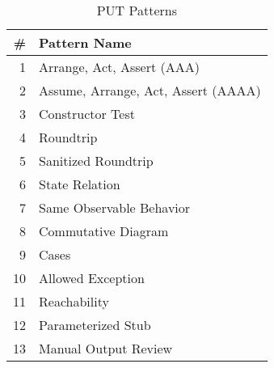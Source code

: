 \setlength{\tabcolsep}{2pt}
\begin{table}[t]
\begin{center}
\begin {tabular} {|r|l|}
\hline
									\#			&	Pattern Name									\\				%
\hline
\hline
									1				&	Arrange, Act, Assert (AAA)					\\				%
\hline
									2				&	Assume, Arrange, Act, Assert (AAAA) 	\\			%
\hline
									3				&	Constructor Test							\\				%
\hline
									4				&	Roundtrip											\\				%
\hline
									5				&	Sanitized Roundtrip						\\				%
\hline
									6				&	State Relation								\\				%
\hline
									7				&	Same Observable Behavior			\\				%
\hline
									8				&	Commutative Diagram						\\					%
\hline
									9				&	Cases													\\					%
\hline
									10			&	Allowed Exception							\\					%
\hline
									11			&	Reachability									\\					%
\hline
									12			&	Parameterized Stub						\\					%
\hline	
									13			&	Manual Output Review					\\					%
\hline
\end{tabular}
\caption {\label{tab:patterns} PUT Patterns}  \vspace*{-3ex}
\end{center}
\end{table}

